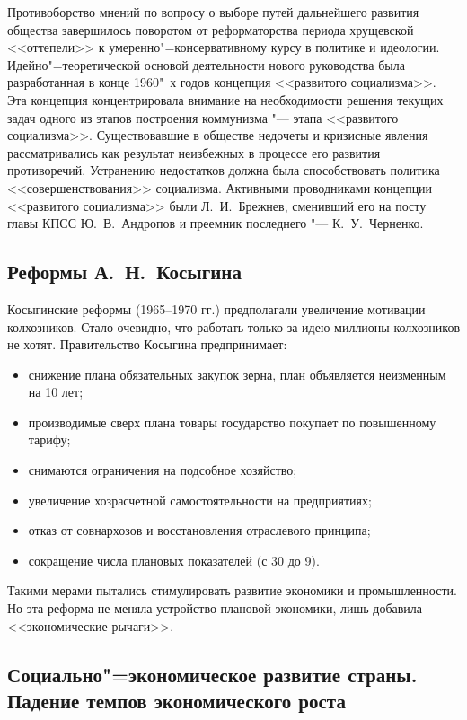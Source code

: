Противоборство мнений по вопросу о выборе путей дальнейшего развития общества завершилось поворотом от реформаторства периода хрущевской <<оттепели>> к умеренно"=консервативному курсу в политике и идеологии. Идейно"=теоретической основой деятельности нового руководства была разработанная в конце 1960"~х годов концепция <<развитого социализма>>. Эта концепция концентрировала внимание на необходимости решения текущих задач одного из этапов построения коммунизма "--- этапа <<развитого социализма>>. Существовавшие в обществе недочеты и кризисные явления рассматривались как результат неизбежных в процессе его развития противоречий. Устранению недостатков должна была способствовать политика <<совершенствования>> социализма. Активными проводниками концепции <<развитого социализма>> были Л.~И.~Брежнев, сменивший его на посту главы КПСС Ю.~В.~Андропов и преемник последнего "--- К.~У.~Черненко.

\subsection{Реформы А.~Н.~Косыгина}

Косыгинские реформы (1965--1970 гг.) предполагали увеличение мотивации колхозников. Стало очевидно, что работать только за идею миллионы колхозников не хотят. Правительство Косыгина предпринимает:

\begin{itemize}
    \item снижение плана обязательных закупок зерна, план объявляется неизменным на 10 лет;
    \item производимые сверх плана товары государство покупает по повышенному тарифу;
    \item снимаются ограничения на подсобное хозяйство;
    \item увеличение хозрасчетной самостоятельности на предприятиях;
    \item отказ от совнархозов и восстановления отраслевого принципа;
    \item сокращение числа плановых показателей (с 30 до 9).
\end{itemize}

Такими мерами пытались стимулировать развитие экономики и промышленности. Но эта реформа не меняла устройство плановой экономики, лишь добавила <<экономические рычаги>>. 


\subsection{Социально"=экономическое развитие страны. Падение темпов экономического роста}

